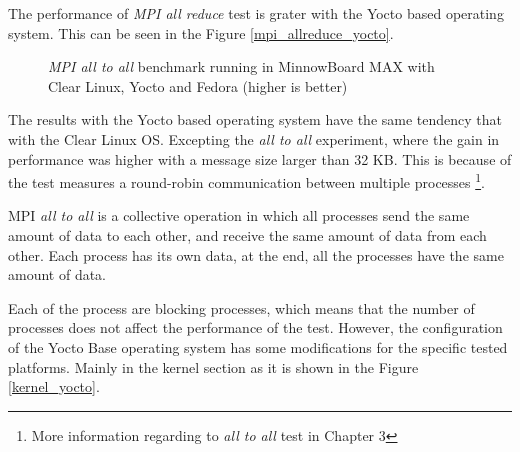 The performance of \textit{MPI all reduce} test is grater with the Yocto based
operating system. This can be seen in the Figure \ref{mpi_allreduce_yocto}.

\begin{figure}[H]
\begin{center}
\end{center}
\caption{\textit{MPI all to all} benchmark running in  MinnowBoard MAX with Clear Linux, Yocto
and Fedora (higher is better)}
\label{mpi_all_to_all_yocto}
\end{figure}

The results with the Yocto based operating system have the same
tendency that with the Clear Linux OS. Excepting  the \textit{all to all}
experiment, where the gain in performance was higher with a message size
larger than 32 KB. This is because of the test measures a round-robin communication 
between multiple processes \footnote{More information regarding to \textit{all
to all} test in Chapter 3}.

MPI \textit{all to all} is a collective operation in which all processes send
the same amount of data to each other, and receive the same amount of data from
each other. Each process has its own data, at the end, all the processes have
the same amount of data. 

Each of the process are blocking processes, which means that the number of
processes does not affect the performance of the test. However,
the configuration of the Yocto Base operating system has 
some modifications for the specific tested platforms. Mainly in the
kernel section as it is shown in the Figure \ref{kernel_yocto}.

\begin{minipage}{\textwidth}
\end{minipage}

